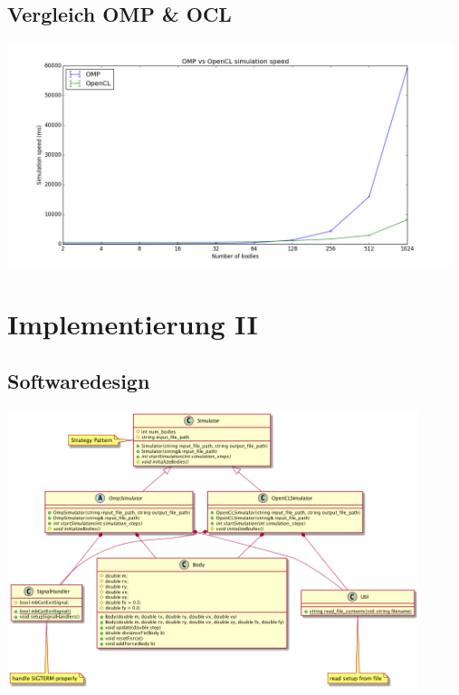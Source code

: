 \documentclass{beamer}
\begin{document}
\subsection{Vergleich OMP \& OCL}
\begin{frame}
\includegraphics[width=13cm]{img/fig_omp_and_ocl.png}
\end{frame}

\section{Implementierung II}
\subsection{Softwaredesign}
\begin{frame}
\includegraphics[width=12cm]{img/classes.png}
\end{frame}
\end{document}
